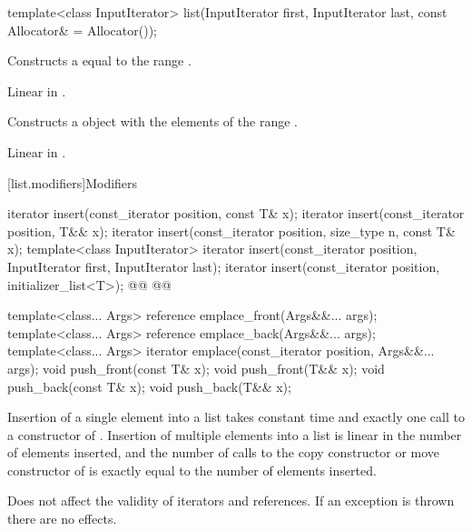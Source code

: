\documentclass{wg21}
\begin{document}
%
\begin{itemdecl}
    template<class InputIterator>
    list(InputIterator first, InputIterator last, const Allocator& = Allocator());
\end{itemdecl}

\begin{itemdescr}
    \pnum
    \effects
    Constructs a
    equal to the range
    .

    \pnum
    \complexity
    Linear in
    .
\end{itemdescr}

\begin{addedblock}
\begin{itemdecl}
template<@@ R>}
list(from_range_t, R&& range, const Allocator& = Allocator());
\end{itemdecl}

\begin{itemdescr}
    \pnum
    \effects
    Constructs a  object with the elements of the range .

    \pnum
    \complexity
    Linear in .
\end{itemdescr}
\end{addedblock}

[list.modifiers]{Modifiers}

%
\begin{itemdecl}
    iterator insert(const_iterator position, const T& x);
    iterator insert(const_iterator position, T&& x);
    iterator insert(const_iterator position, size_type n, const T& x);
    template<class InputIterator>
    iterator insert(const_iterator position, InputIterator first,
    InputIterator last);
    iterator insert(const_iterator position, initializer_list<T>);
    @@
    @@

    template<class... Args> reference emplace_front(Args&&... args);
    template<class... Args> reference emplace_back(Args&&... args);
    template<class... Args> iterator emplace(const_iterator position, Args&&... args);
    void push_front(const T& x);
    void push_front(T&& x);
    void push_back(const T& x);
    void push_back(T&& x);
\end{itemdecl}

\begin{itemdescr}
    \pnum
    \complexity
    Insertion of a single element into a list takes constant time and
    exactly one call to a constructor of
    . Insertion of multiple elements into a list is linear in the
    number of elements inserted, and the number of calls to the copy
    constructor or move constructor of  is exactly equal
    to the number of elements inserted.

    \pnum
    \remarks
    Does not affect the validity of iterators and references.
    If an exception is thrown there are no effects.
\end{itemdescr}
\end{document}
